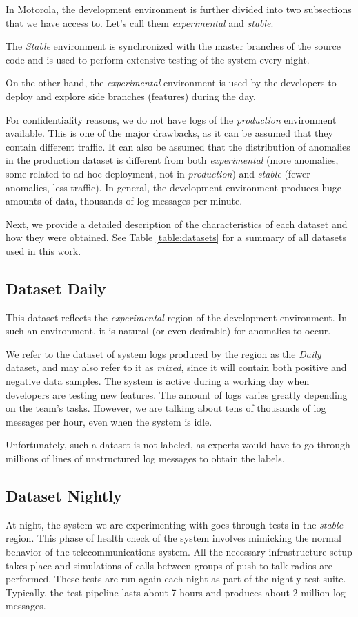 In Motorola, the development environment is further divided into two subsections that we have access to. 
Let's call them \textit{experimental} and \textit{stable}. 

The \textit{Stable} environment is synchronized with the master branches of the source code and is used to perform extensive testing of the system every night. 

On the other hand, the \textit{experimental} environment is used by the developers to deploy and explore side branches (features) during the day.

For confidentiality reasons, we do not have logs of the \textit{production} environment available. This is one of the major drawbacks, as it can be assumed that they contain different traffic. It can also be assumed that the distribution of anomalies in the production dataset is different from both \textit{experimental} (more anomalies, some related to ad hoc deployment, not in \textit{production}) and \textit{stable} (fewer anomalies, less traffic). In general, the development environment produces huge amounts of data, thousands of log messages per minute.

Next, we provide a detailed description of the characteristics of each dataset and how they were obtained. See Table \ref{table:datasets} for a summary of all datasets used in this work.

\subsection{Dataset Daily} 
This dataset reflects the \textit{experimental} region of the development environment. In such an environment, it is natural (or even desirable) for anomalies to occur.

We refer to the dataset of system logs produced by the region as the \textit{Daily} dataset, and may also refer to it as \textit{mixed}, since it will contain both positive and negative data samples. 
The system is active during a working day when developers are testing new features. The amount of logs varies greatly depending on the team's tasks. 
However, we are talking about tens of thousands of log messages per hour, even when the system is idle.

Unfortunately, such a dataset is not labeled, as experts would have to go through millions of lines of unstructured log messages to obtain the labels.

\subsection{Dataset Nightly}
At night, the system we are experimenting with goes through tests in the \textit{stable} region. This phase of health check of the system involves mimicking the normal behavior of the telecommunications system. All the necessary infrastructure setup takes place and simulations of calls between groups of push-to-talk radios are performed. 
These tests are run again each night as part of the nightly test suite. 
Typically, the test pipeline lasts about 7 hours and produces about 2 million log messages.


